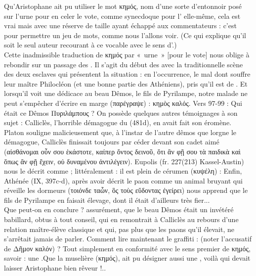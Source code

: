 {Qu'Aristophane ait pu utiliser le mot κημός, nom d'une sorte d'entonnoir posé sur l'urne pour en celer le vote, comme synecdoque pour l' elle-même, cela est vrai mais avec une réserve de taille ayant échappé aux commentateurs : c'est pour permettre un jeu de mots, comme nous l'allons voir. (Ce qui explique qu'il soit le seul auteur recourant à ce vocable avec le sens d'.)\\
Cette inadmissible traduction de κημός par «~urne~» [pour le vote] nous oblige à rebondir sur un passage des . Il s'agit du début des  avec la traditionnelle scène des deux esclaves qui présentent la situation : en l'occurrence, le mal dont souffre leur maître Philocléon (et une bonne partie des Athéniens), pris qu'il est de . Et lorsqu'il voit une dédicace au beau Dêmos, le fils de Pyrilampe, notre malade ne peut s'empêcher d'écrire en marge (παρέγραψε) : κημὸς καλός. Vers 97-99 :
Qui était ce Dêmos Πυριλάμπους ? On possède quelques autres témoignages à son sujet : Calliclès, l'horrible démagogue du  (481d), en avait fait son éromène. 
Platon souligne malicieusement que, à l'instar de l'autre dêmos que lorgne le démagogue, Calliclès finissait toujours par céder devant son cadet aimé (αἰσθάνομαι οὖν σου ἑκάστοτε, καίπερ ὄντος δεινοῦ, ὅτι ἂν φῇ σου τὰ παιδικὰ καὶ ὅπως ἂν φῇ ἔχειν, οὐ δυναμένου ἀντιλέγειν). 
Eupolis (fr. 227(213) Kassel-Austin) nous le décrit comme  ; littéralement : il est plein de cérumen (κυψέλη) : 
Enfin, Athénée (IX, 397c-d), après avoir décrit le paon comme un animal bruyant qui réveille les dormeurs (τοιόνδε ταὧν, ὃς τοὺς εὕδοντας ἐγείρει) nous apprend que le fils de Pyrilampe en faisait élevage, dont il était d'ailleurs très fier...\\
Que peut-on en conclure ? assurément, que le beau Dêmos était un invétéré babillard, obtus à tout conseil, qui en remontrait à Calliclès au rebours d'une relation maître-élève classique et qui, pas plus que les paons qu'il élevait, ne s'arrêtait jamais de parler.
Comment lire maintenant le graffiti : (noter l'accusatif de Δῆμον καλόν) ?
Tout simplement en conformité avec le sens premier de κημός, savoir : une .Que la muselière (κημός), ait pu désigner aussi une , voilà qui devait laisser Aristophane bien rêveur !..
}
